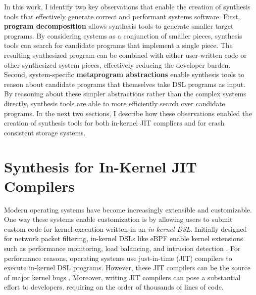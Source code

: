 In this work, I identify two key observations that enable the creation of synthesis tools
that effectively generate correct and performant systems software.
First, \textbf{program decomposition} allows synthesis tools to generate smaller target programs.
By considering systems as a conjunction of smaller pieces,
synthesis tools can search for candidate programs that implement a single piece.
The resulting synthesized program can be combined with either user-written code or
other synthesized system pieces, effectively reducing the developer burden.
Second, system-specific \textbf{metaprogram abstractions} enable synthesis tools to reason 
about candidate programs that themselves take DSL programs as input.
By reasoning about these simpler abstractions rather than the complex systems directly,
synthesis tools are able to more efficiently search over candidate programs.
In the next two sections, I describe how these observations enabled the creation of
synthesis tools for both in-kernel JIT compliers and for crash consistent storage systems.

\fi


\section{Synthesis for In-Kernel JIT Compilers}
Modern operating systems have become increasingly extensible and customizable.
One way these systems enable customization is by
allowing users to submit custom code for kernel execution
written in an \textit{in-kernel DSL}.
Initially designed for network packet filtering, 
in-kernel DSLs like eBPF \cite{fleming:ebpf} enable kernel extensions
such as performance monitoring, load balancing, and intrusion detection
\cite{engler:vcode,fleming:ebpf,mccanne:bpf}.
For performance reasons, operating systems use just-in-time (JIT) compilers
to execute in-kernel DSL programs.
However,
these JIT compilers can be the source of major kernel bugs
\cite{gpz:1454,paul:cve-2020-8835,blazakis:jit-spraying,kocher:spectre}.
Moreover, writing JIT compilers can pose a substantial effort to developers,
requiring on the order of thousands of lines of code.

